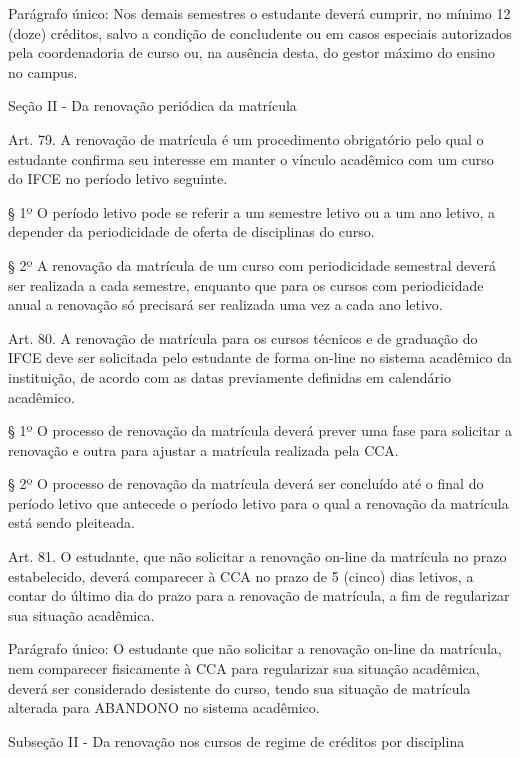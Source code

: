 \documentclass{paper}
\begin{document}
Parágrafo único: Nos demais semestres o estudante deverá cumprir, no mínimo 12 (doze) créditos, salvo a condição de concludente ou em casos especiais autorizados pela coordenadoria de curso ou, na ausência desta, do gestor máximo do ensino no campus.

\begin{center}
Seção II - Da renovação periódica da matrícula
\end{center}

Art. 79. A renovação de matrícula é um procedimento obrigatório pelo qual o estudante confirma seu interesse em manter o vínculo acadêmico com um curso do IFCE no período letivo seguinte.

§ 1º O período letivo pode se referir a um semestre letivo ou a um ano letivo, a depender da periodicidade de oferta de disciplinas do curso.

§ 2º A renovação da matrícula de um curso com periodicidade semestral deverá ser realizada a cada semestre, enquanto que para os cursos com periodicidade anual a renovação só precisará ser realizada uma vez a cada ano letivo.

Art. 80. A renovação de matrícula para os cursos técnicos e de graduação do IFCE deve ser solicitada pelo estudante de forma on-line no sistema acadêmico da instituição, de acordo com as datas previamente definidas em calendário acadêmico.

§ 1º O processo de renovação da matrícula deverá prever uma fase para solicitar a renovação e outra para ajustar a matrícula realizada pela CCA.

§ 2º O processo de renovação da matrícula deverá ser concluído até o final do período letivo que antecede o período letivo para o qual a renovação da matrícula está sendo pleiteada.

Art. 81. O estudante, que não solicitar a renovação on-line da matrícula no prazo estabelecido, deverá comparecer à CCA no prazo de 5 (cinco) dias letivos, a contar do último dia do prazo para a renovação de matrícula, a fim de regularizar sua situação acadêmica.

Parágrafo único: O estudante que não solicitar a renovação on-line da matrícula, nem comparecer fisicamente à CCA para regularizar sua situação acadêmica, deverá ser considerado desistente do curso, tendo sua situação de matrícula alterada para ABANDONO no sistema acadêmico.

\begin{center}
Subseção II - Da renovação nos cursos de regime de créditos por disciplina
\end{center}
\end{document}
